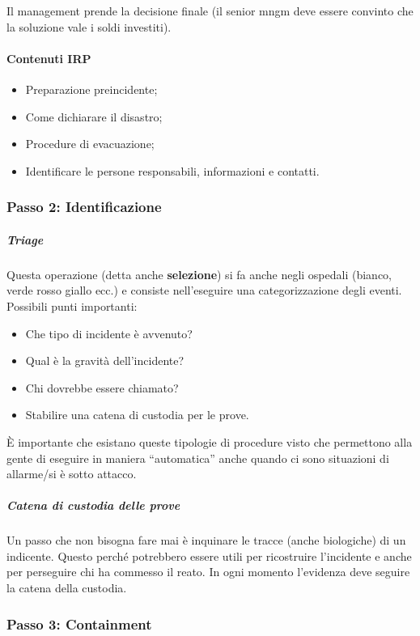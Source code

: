 Il management prende la decisione finale (il senior mngm deve essere convinto
che la soluzione vale i soldi investiti).

\paragraph*{Contenuti IRP}

\begin{itemize}
\item Preparazione preincidente;
\item Come dichiarare il disastro;
\item Procedure di evacuazione;
\item Identificare le persone responsabili, informazioni e contatti.
\end{itemize}

\subsubsection{Passo 2: Identificazione}

\subparagraph*{Triage} Questa operazione (detta anche \textbf{selezione}) si fa
anche negli ospedali (bianco, verde rosso giallo ecc.) e consiste nell'eseguire
una categorizzazione degli eventi. Possibili punti importanti:
\begin{itemize}
\item Che tipo di incidente è avvenuto?
\item Qual è la gravità dell'incidente?
\item Chi dovrebbe essere chiamato?
\item Stabilire una catena di custodia per le prove.
\end{itemize}

È importante che esistano queste tipologie di procedure visto che permettono alla
gente di eseguire in maniera ``automatica'' anche quando ci sono situazioni di
allarme/si è sotto attacco.

\subparagraph*{Catena di custodia delle prove} Un passo che non bisogna fare mai
è inquinare le tracce (anche biologiche) di un indicente. Questo perché
potrebbero essere utili per ricostruire l'incidente e anche per perseguire
chi ha commesso il reato.
In ogni momento l'evidenza deve seguire la catena della custodia.

\subsubsection{Passo 3: Containment}

